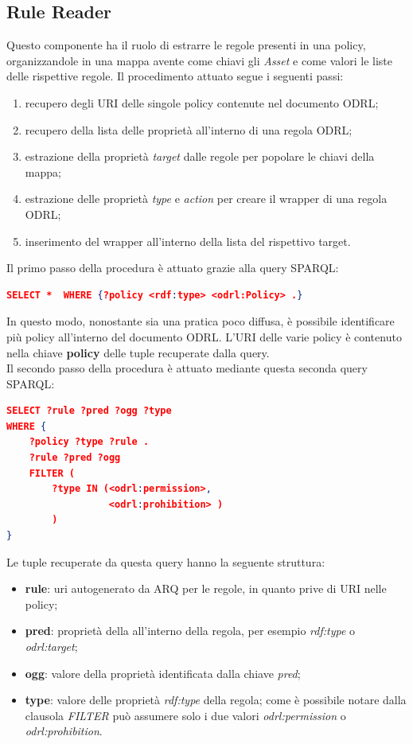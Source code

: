 \documentclass[12pt,a4paper,twoside]{book}
\begin{document}
\subsection{Rule Reader}
Questo componente ha il ruolo di estrarre le regole presenti in una policy, organizzandole in una mappa avente come chiavi gli \textit{Asset} e come valori le liste delle rispettive regole. Il procedimento attuato segue i seguenti passi:
\begin{enumerate}
\item recupero degli URI delle singole policy contenute nel documento ODRL;
\item recupero della lista delle proprietà all'interno di una regola ODRL;
\item estrazione della proprietà \textit{target} dalle regole per popolare le chiavi della mappa;
\item estrazione delle proprietà \textit{type} e \textit{action} per creare il wrapper di una regola ODRL;
\item inserimento del wrapper all'interno della lista del rispettivo target.
\end{enumerate} 
Il primo passo della procedura è attuato grazie alla query SPARQL:
\begin{lstlisting}[language=json,firstnumber=1,caption={Query per il recupero dei dati relativi a tutte le policy contenute nel documento ODRL},captionpos=b]
SELECT *  WHERE {?policy <rdf:type> <odrl:Policy> .}
\end{lstlisting}
In questo modo, nonostante sia una pratica poco diffusa, è possibile identificare più policy all'interno del documento ODRL. L'URI delle varie policy è contenuto nella chiave \textbf{policy} delle tuple recuperate dalla query.\\
Il secondo passo della procedura è attuato mediante questa seconda query SPARQL:
\begin{lstlisting}[language=json,firstnumber=1,caption={Query per il recupero delle proprietà di tutte le regole},captionpos=b]
SELECT ?rule ?pred ?ogg ?type
WHERE {
	?policy ?type ?rule .
	?rule ?pred ?ogg
	FILTER (
		?type IN (<odrl:permission>,
		          <odrl:prohibition> )
		)
}
\end{lstlisting}
Le tuple recuperate da questa query hanno la seguente struttura:
\begin{itemize}
\item \textbf{rule}: uri autogenerato da ARQ per le regole, in quanto prive di URI nelle policy;
\item \textbf{pred}: proprietà della all'interno della regola, per esempio \textit{rdf:type} o \textit{odrl:target};
\item \textbf{ogg}: valore della proprietà identificata dalla chiave \textit{pred};
\item \textbf{type}: valore delle proprietà \textit{rdf:type} della regola; come è possibile notare dalla clausola \textit{FILTER} può assumere solo i due valori \textit{odrl:permission} o \textit{odrl:prohibition}.
\end{itemize}
\end{document}
